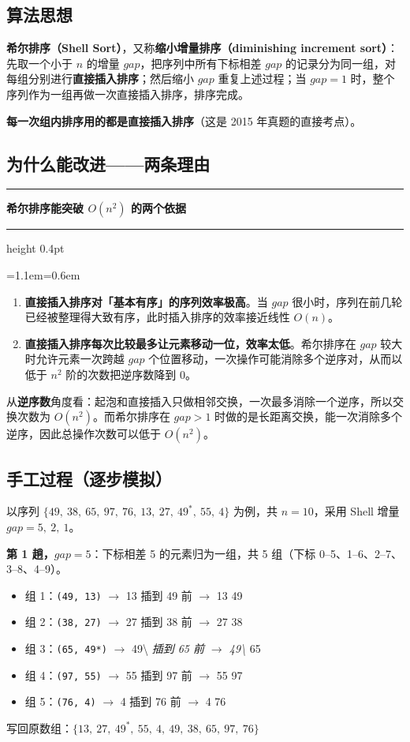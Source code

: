 \documentclass[11pt,openany,UTF8]{ctexbook}
\newcommand{\callouthead}[2]{%
  \par\addvspace{7pt}\noindent
  {\color{#1}\rule[-0.15em]{3pt}{1.05em}}\hspace{0.5em}%
  {\bfseries\color{#1}#2}\par\nobreak\vspace{-0.35em}%
  {\color{rulesep}\hrule height 0.4pt}\nobreak\vspace{0.45em}%
  \begingroup\small\setlength{\parindent}{0pt}%
  \leftskip=1.1em\rightskip=0.6em\noindent\ignorespaces}
\newcommand{\calloutend}{\par\endgroup\addvspace{7pt}}
\newenvironment{callkey}[1]{\callouthead{keybar}{#1}}{\calloutend}
\begin{document}
\subsection{算法思想}

\textbf{希尔排序（Shell Sort）}，又称\textbf{缩小增量排序（diminishing increment sort）}：先取一个小于 $n$ 的增量 $gap$，把序列中所有下标相差 $gap$ 的记录分为同一组，对每组分别进行\textbf{直接插入排序}；然后缩小 $gap$ 重复上述过程；当 $gap=1$ 时，整个序列作为一组再做一次直接插入排序，排序完成。

\textbf{每一次组内排序用的都是直接插入排序}（这是 2015 年真题的直接考点）。

\subsection{为什么能改进——两条理由}

\begin{callkey}{希尔排序能突破 $O(n^2)$ 的两个依据}
\begin{enumerate}
\item \textbf{直接插入排序对「基本有序」的序列效率极高}。当 $gap$ 很小时，序列在前几轮已经被整理得大致有序，此时插入排序的效率接近线性 $O(n)$。
\item \textbf{直接插入排序每次比较最多让元素移动一位，效率太低}。希尔排序在 $gap$ 较大时允许元素一次跨越 $gap$ 个位置移动，一次操作可能消除多个逆序对，从而以低于 $n^2$ 阶的次数把逆序数降到 0。
\end{enumerate}
\end{callkey}

从\textbf{逆序数}角度看：起泡和直接插入只做相邻交换，一次最多消除一个逆序，所以交换次数为 $O(n^2)$。而希尔排序在 $gap>1$ 时做的是长距离交换，能一次消除多个逆序，因此总操作次数可以低于 $O(n^2)$。

\subsection{手工过程（逐步模拟）}

以序列 $\{49,\ 38,\ 65,\ 97,\ 76,\ 13,\ 27,\ 49^*,\ 55,\ 4\}$ 为例，共 $n=10$，采用 Shell 增量 $gap = 5,\ 2,\ 1$。

\textbf{第 1 趟，$gap=5$}：下标相差 5 的元素归为一组，共 5 组（下标 0–5、1–6、2–7、3–8、4–9）。

\begin{itemize}
\item 组 1：\texttt{(49,\allowbreak{} 13)\allowbreak{}} $\to$ 13 插到 49 前 $\to$ 13 49
\item 组 2：\texttt{(38,\allowbreak{} 27)\allowbreak{}} $\to$ 27 插到 38 前 $\to$ 27 38
\item 组 3：\texttt{(65,\allowbreak{} 49*)\allowbreak{}} $\to$ 49\textbackslash{}\emph{ 插到 65 前 $\to$ 49\textbackslash{}} 65
\item 组 4：\texttt{(97,\allowbreak{} 55)\allowbreak{}} $\to$ 55 插到 97 前 $\to$ 55 97
\item 组 5：\texttt{(76,\allowbreak{} 4)\allowbreak{}} $\to$ 4 插到 76 前 $\to$ 4 76
\end{itemize}
写回原数组：$\{13,\ 27,\ 49^*,\ 55,\ 4,\ 49,\ 38,\ 65,\ 97,\ 76\}$
\end{document}
